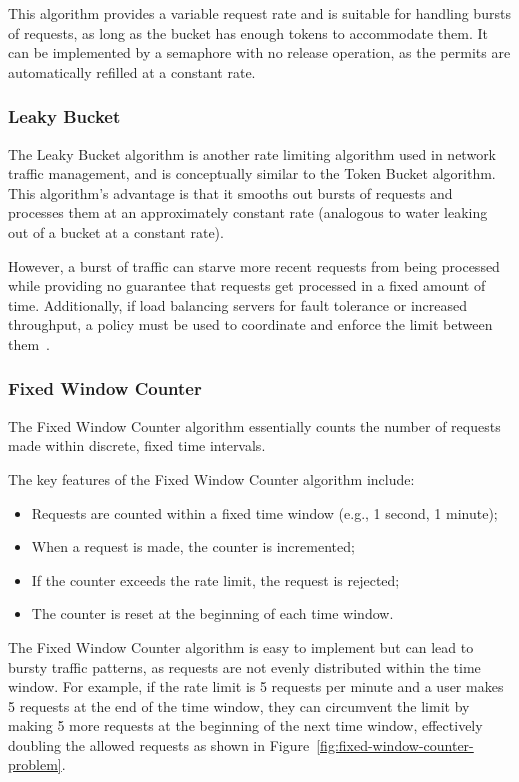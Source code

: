 This algorithm provides a variable request rate and is suitable for handling bursts of requests,
as long as the bucket has enough tokens to accommodate them.
It can be implemented by a semaphore with no release operation,
as the permits are automatically refilled at a constant rate.

\subsubsection{Leaky Bucket}\label{subsubsec:leaky-bucket-algorithm}

The Leaky Bucket algorithm is another rate limiting algorithm used in network traffic management, and is conceptually similar to the Token Bucket algorithm.
This algorithm's advantage is that it smooths out bursts of requests
and processes them at an approximately constant rate (analogous to water leaking out of a bucket at a constant rate).

However,
a burst of traffic can starve more recent requests from being processed
while providing no guarantee that requests get processed in a fixed amount of time.
Additionally, if load balancing servers for fault tolerance or increased throughput, a policy must be used to coordinate and enforce the limit between them~\cite{kong-rate-limiting}.

\subsubsection{Fixed Window Counter}\label{subsubsec:fixed-window-counter-algorithm}

The Fixed Window Counter algorithm essentially counts the number of requests made within discrete,
fixed time intervals.

The key features of the Fixed Window Counter algorithm include:

\begin{itemize}
    \item Requests are counted within a fixed time window (e.g., 1 second, 1 minute);
    \item When a request is made, the counter is incremented;
    \item If the counter exceeds the rate limit, the request is rejected;
    \item The counter is reset at the beginning of each time window.
\end{itemize}

The Fixed Window Counter algorithm is easy to implement but can lead to bursty traffic patterns, as requests are not evenly distributed within the time window.
For example, if the rate limit is 5 requests per minute and a user makes 5 requests at the end of the time window, they can circumvent the limit by making 5 more requests at the beginning of the next time window, effectively doubling the allowed requests as shown in Figure~\ref{fig:fixed-window-counter-problem}.

